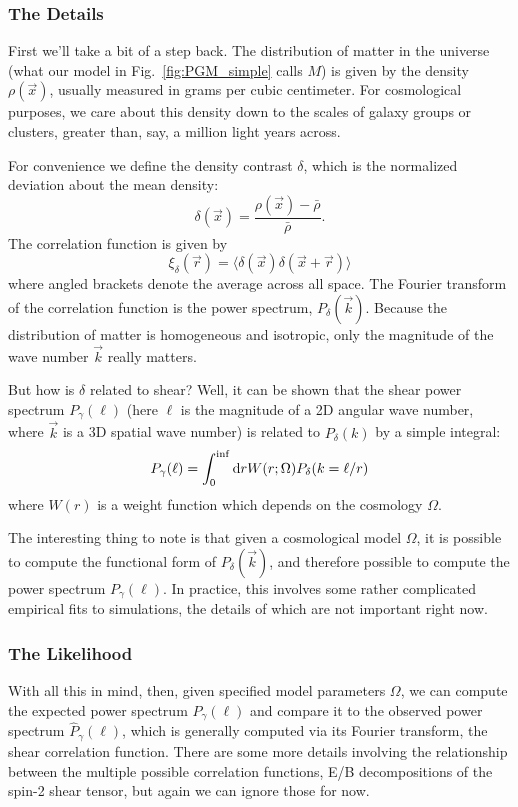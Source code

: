 \documentclass[12pt]{article}
\newcommand{\fig}[1]{Fig.~\ref{fig:#1}}
\begin{document}
\subsubsection{The Details}
First we'll take a bit of a step back.  The distribution of matter in the
universe (what our model in \fig{PGM_simple} calls $M$) is given by the
density $\rho(\vec{x})$, usually measured in grams per cubic centimeter.
For cosmological purposes, we care about this density down to the scales
of galaxy groups or clusters, greater than, say, a million light years across.

For convenience we define the density contrast $\delta$, which is the
normalized deviation about the mean density:
\begin{equation}
  \delta(\vec{x}) = \frac{\rho(\vec{x}) - \bar{\rho}}{\bar{\rho}}.
\end{equation}
The correlation function is given by
\begin{equation}
  \xi_\delta(\vec{r}) = \langle \delta(\vec{x})\delta(\vec{x} + \vec{r})\rangle
\end{equation}
where angled brackets denote the average across all space.  The Fourier
transform of the correlation function is the power spectrum,
$P_\delta(\vec{k})$.  Because the distribution of matter is homogeneous and
isotropic, only the magnitude of the wave number $\vec{k}$ really matters.

But how is $\delta$ related to shear?  Well, it can be shown that the shear
power spectrum $P_\gamma(\ell)$ (here $\ell$ is the magnitude of a 2D angular
wave number, where $\vec{k}$ is a 3D spatial wave number) is related to
$P_\delta(k)$ by a simple integral:
\begin{equation}
  P_\gamma(\ell) = \int_0^{\inf} {\rm d}r W(r;\Omega) P_\delta(k = \ell/r)
\end{equation}
where $W(r)$ is a weight function which depends on the cosmology $\Omega$.

The interesting thing to note is that given a cosmological model $\Omega$,
it is possible to compute the functional form of $P_\delta(\vec{k})$, and
therefore possible to compute the power spectrum $P_\gamma(\ell)$.  In
practice, this involves some rather complicated empirical fits to simulations,
the details of which are not important right now.

\subsubsection{The Likelihood}
With all this in mind, then, given specified model parameters $\Omega$, we
can compute the expected power spectrum $P_\gamma(\ell)$ and compare it to
the observed power spectrum $\hat{P}_\gamma(\ell)$, which is generally computed
via its Fourier transform, the shear correlation function.
There are some more details involving the relationship between the multiple
possible correlation functions, E/B decompositions of the spin-2 shear
tensor, but again we can ignore those for now.
\end{document}
